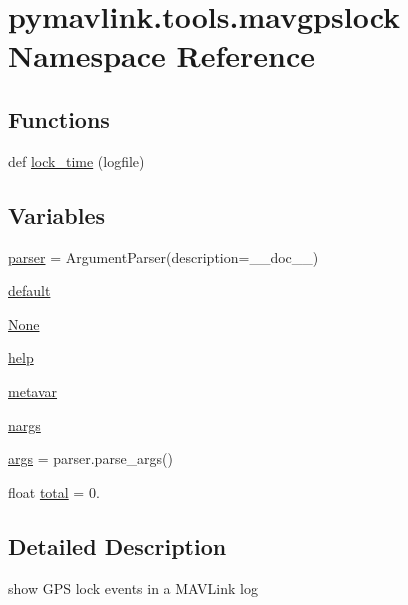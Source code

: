 \hypertarget{namespacepymavlink_1_1tools_1_1mavgpslock}{}\section{pymavlink.\+tools.\+mavgpslock Namespace Reference}
\label{namespacepymavlink_1_1tools_1_1mavgpslock}
\subsection*{Functions}
\begin{DoxyCompactItemize}
\item 
def \mbox{\hyperlink{namespacepymavlink_1_1tools_1_1mavgpslock_ae6a0ce5a3f2fe9b9606f2e60149a3da6}{lock\+\_\+time}} (logfile)
\end{DoxyCompactItemize}
\subsection*{Variables}
\begin{DoxyCompactItemize}
\item 
\mbox{\hyperlink{namespacepymavlink_1_1tools_1_1mavgpslock_a8e832f448bfc5b7630182bafc8da2ce9}{parser}} = Argument\+Parser(description=\+\_\+\+\_\+doc\+\_\+\+\_\+)
\item 
\mbox{\hyperlink{namespacepymavlink_1_1tools_1_1mavgpslock_a4cef6c24707d7697782aed2147e8d51a}{default}}
\item 
\mbox{\hyperlink{namespacepymavlink_1_1tools_1_1mavgpslock_a7b66918b776eb4b648739f157232e807}{None}}
\item 
\mbox{\hyperlink{namespacepymavlink_1_1tools_1_1mavgpslock_a914bf70e459f7517614de1bb37ad6f33}{help}}
\item 
\mbox{\hyperlink{namespacepymavlink_1_1tools_1_1mavgpslock_a97b05b92db3c526847b599250e271ca0}{metavar}}
\item 
\mbox{\hyperlink{namespacepymavlink_1_1tools_1_1mavgpslock_a993744546fb7a332e0f23c0e29bd8525}{nargs}}
\item 
\mbox{\hyperlink{namespacepymavlink_1_1tools_1_1mavgpslock_a33276294667978e2a2f759ce0d530cea}{args}} = parser.\+parse\+\_\+args()
\item 
float \mbox{\hyperlink{namespacepymavlink_1_1tools_1_1mavgpslock_aa9d92f4a34bd654b37cf6fb30414ad3f}{total}} = 0.
\end{DoxyCompactItemize}


\subsection{Detailed Description}
\begin{DoxyVerb}show GPS lock events in a MAVLink log
\end{DoxyVerb}
 

